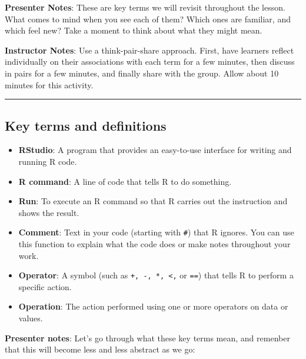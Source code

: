 \documentclass[
  letterpaper,
  DIV=11,
  numbers=noendperiod]{scrartcl}
\providecommand{\tightlist}{%
  \setlength{\itemsep}{0pt}\setlength{\parskip}{0pt}}
\begin{document}
\textbf{Presenter Notes}: These are key terms we will revisit throughout
the lesson. What comes to mind when you see each of them? Which ones are
familiar, and which feel new? Take a moment to think about what they
might mean.

\textbf{Instructor Notes}: Use a think-pair-share approach. First, have
learners reflect individually on their associations with each term for a
few minutes, then discuss in pairs for a few minutes, and finally share
with the group. Allow about 10 minutes for this activity.

\begin{center}\rule{0.5\linewidth}{0.5pt}\end{center}

\subsection{Key terms and
definitions}\label{key-terms-and-definitions-1}

\begin{itemize}
\tightlist
\item
  \textbf{RStudio}: A program that provides an easy-to-use interface for
  writing and running R code.\\
\item
  \textbf{R command}: A line of code that tells R to do something.\\
\item
  \textbf{Run}: To execute an R command so that R carries out the
  instruction and shows the result.\\
\item
  \textbf{Comment}: Text in your code (starting with \texttt{\#}) that R
  ignores. You can use this function to explain what the code does or
  make notes throughout your work.
\item
  \textbf{Operator}: A symbol (such as \texttt{+,\ -,\ *,\ \textless{},}
  or \texttt{==}) that tells R to perform a specific action.
\item
  \textbf{Operation}: The action performed using one or more operators
  on data or values.
\end{itemize}

\textbf{Presenter notes}: Let's go through what these key terms mean,
and remenber that this will become less and less abstract as we go:
\end{document}

